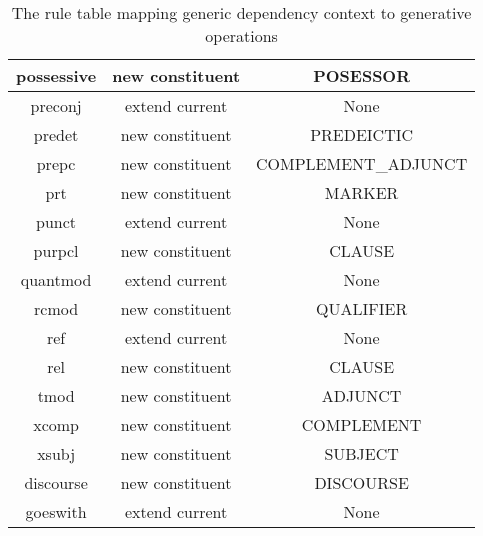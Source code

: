 \begin{table}[!ht]
{\begin{tabular}{|c|c|c|}
            possessive            & new constituent             & POSESSOR                         \\ \hline
            preconj               & extend current              & None                             \\ \hline
            predet                & new constituent             & PREDEICTIC                       \\ \hline
            prepc                 & new constituent             & COMPLEMENT\_ADJUNCT              \\ \hline
            prt                   & new constituent             & MARKER                           \\ \hline
            punct                 & extend current              & None                             \\ \hline
            purpcl                & new constituent             & CLAUSE                           \\ \hline
            quantmod              & extend current              & None                             \\ \hline
            rcmod                 & new constituent             & QUALIFIER                        \\ \hline
            ref                   & extend current              & None                             \\ \hline
            rel                   & new constituent             & CLAUSE                           \\ \hline
            tmod                  & new constituent             & ADJUNCT                          \\ \hline
            xcomp                 & new constituent             & COMPLEMENT                       \\ \hline
            xsubj                 & new constituent             & SUBJECT                          \\ \hline
            discourse             & new constituent             & DISCOURSE                        \\ \hline
            goeswith              & extend current              & None                             \\ \hline
        \end{tabular}%
    }
    \caption{The rule table mapping generic dependency context to generative operations}
    \label{tab:rule-table-complete}
\end{table}
